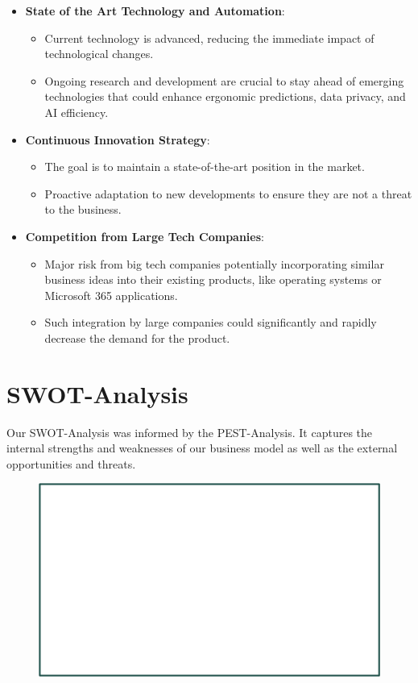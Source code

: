 \begin{itemize}
  \item \textbf{State of the Art Technology and Automation}:
  \begin{itemize}
    \item Current technology is advanced, reducing the immediate impact of technological changes.
    \item Ongoing research and development are crucial to stay ahead of emerging technologies that could enhance ergonomic predictions, data privacy, and AI efficiency.
  \end{itemize}

  \item \textbf{Continuous Innovation Strategy}:
  \begin{itemize}
    \item The goal is to maintain a state-of-the-art position in the market.
    \item Proactive adaptation to new developments to ensure they are not a threat to the business.
  \end{itemize}

  \item \textbf{Competition from Large Tech Companies}:
  \begin{itemize}
    \item Major risk from big tech companies potentially incorporating similar business ideas into their existing products, like operating systems or Microsoft 365 applications.
    \item Such integration by large companies could significantly and rapidly decrease the demand for the product.
  \end{itemize}
\end{itemize}

\section{SWOT-Analysis}

Our SWOT-Analysis was informed by the PEST-Analysis. It captures the internal strengths and weaknesses of our business model as well as the external opportunities and threats.

\begin{figure}[H]
    \includegraphics[width=\textwidth]{SWOT_analysis.png}
\end{figure}
